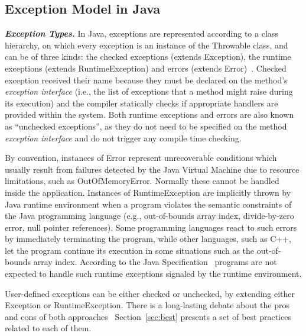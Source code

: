 \documentclass[conference]{IEEEtran}
\begin{document}

\subsection{Exception Model in Java} \label{sec:extypes}

\emph{\textbf{Exception Types.}} In Java, exceptions are represented according to a class hierarchy, on which
 every exception is an instance of the Throwable class, and can be of three kinds: the checked exceptions
(extends Exception), the runtime exceptions (extends RuntimeException) and errors
(extends Error)~\cite{gosling2000java}. Checked exception received their name
 because they must be declared on the method's \emph{exception interface} (i.e., the list of exceptions that a method 
might raise during its execution) and the compiler statically checks if
 appropriate handlers are provided within the system.
Both runtime exceptions and errors are also known as ``unchecked exceptions'', as 
they do not need to be specified on the method \emph{exception interface} and do not trigger any 
compile time checking.

By convention, instances of Error represent  unrecoverable conditions which usually result
from failures detected by the Java Virtual Machine due to resource limitations, such as OutOfMemoryError.
Normally these cannot be handled inside the application.  Instances of RuntimeException are implicitly 
thrown by Java runtime environment when a program violates 
the semantic constraints of the Java programming language (e.g., out-of-bounds array index, divide-by-zero 
error, null pointer references). Some programming languages react to such errors by immediately terminating the program, while
other languages, such as C++, let the program  continue
 its execution in some situations such as the out-of-bounds array index.
According to the Java Specification~\cite{gosling2000java} programs are not 
expected to handle such runtime exceptions signaled by the runtime environment. 

User-defined exceptions can be either checked
 or unchecked, by extending either Exception or RuntimeException. There is a long-lasting debate 
about the pros and cons of both approaches~\cite{javatut,stackoverlow,debate}
Section~\ref{sec:best} presents
a set of best practices related to each of them.
\end{document}
